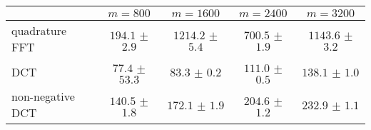 \centering
\renewcommand{\arraystretch}{1.2}
\begin{tabular}{@{}lcccc@{}}
\toprule
 & $m=800$ & $m=1600$ & $m=2400$ & $m=3200$\\
\midrule
quadrature FFT & $194.1$ $\pm$ $2.9$ & $1214.2$ $\pm$ $5.4$ & $700.5$ $\pm$ $1.9$ & $1143.6$ $\pm$ $3.2$ \\
DCT & $77.4$ $\pm$ $53.3$ & $83.3$ $\pm$ $0.2$ & $111.0$ $\pm$ $0.5$ & $138.1$ $\pm$ $1.0$ \\
non-negative DCT & $140.5$ $\pm$ $1.8$ & $172.1$ $\pm$ $1.9$ & $204.6$ $\pm$ $1.2$ & $232.9$ $\pm$ $1.1$ \\
\bottomrule
\end{tabular}
